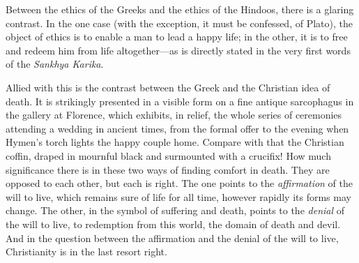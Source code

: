 Between the ethics of the Greeks and the ethics of the Hindoos, there
is a glaring contrast. In the one case (with the exception, it must be
confessed, of Plato), the object of ethics is to enable a man to lead
a happy life; in the other, it is to free and redeem him from life
altogether---as is directly stated in the very first words of the
\textit{Sankhya Karika}.

Allied with this is the contrast between the Greek and the Christian
idea of death. It is strikingly presented in a visible form on a fine
antique sarcophagus in the gallery at Florence, which exhibits, in
relief, the whole series of ceremonies attending a wedding in ancient
times, from the formal offer to the evening when Hymen's torch lights
the happy couple home. Compare with that the Christian coffin, draped
in mournful black and surmounted with a crucifix! How much
significance there is in these two ways of finding comfort in death.
They  are opposed to each other, but each is right. The one
points to the \textit{affirmation} of the will to live, which remains
sure of life for all time, however rapidly its forms may change. The
other, in the symbol of suffering and death, points to the
\textit{denial} of the will to live, to redemption from this world,
the domain of death and devil. And in the question between the
affirmation and the denial of the will to live, Christianity is in the
last resort right.

